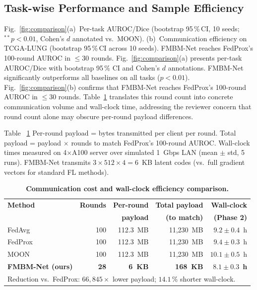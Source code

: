 \documentclass{ieeeaccess}
\begin{document}
\subsection{Task-wise Performance and Sample Efficiency}
Fig.~\ref{fig:comparison}(a)~Per-task AUROC/Dice (bootstrap 95\,\%\,CI, 10 seeds; $^{**}p\!<\!0.01$,
Cohen's $d$ annotated vs.\ MOON).
(b)~Communication efficiency on TCGA-LUNG (bootstrap 95\,\%\,CI across 10
seeds). FMBM-Net reaches FedProx's 100-round AUROC in $\leq\!30$ rounds.
Fig.~\ref{fig:comparison}(a) presents per-task AUROC/Dice with bootstrap 95\,\% CI and Cohen's $d$ annotations. FMBM-Net significantly outperforms all baselines on all tasks ($p\!<\!0.01$). Fig.~\ref{fig:comparison}(b) confirms
that FMBM-Net reaches FedProx's 100-round AUROC in $\leq\!30$ rounds. Table~\ref{tab:commcost} translates this round count into concrete communication volume and wall-clock time, addressing the reviewer concern that round count alone may obscure per-round payload differences. 

Table ~\ref{tab:commcost} Per-round payload = bytes transmitted per client per round.
Total payload = payload $\times$ rounds to match FedProx's 100-round AUROC.
Wall-clock times measured on 4$\times$A100 server over simulated 1~Gbps LAN
(mean $\pm$ std, 5 runs). FMBM-Net transmits $3\!\times\!512\!\times\!4\!=\!6$~KB
latent codes (vs.\ full gradient vectors for standard FL methods).
\begin{table}[!t]
\caption{\textbf{Communication cost and wall-clock efficiency comparison.}}
\label{tab:commcost}
\centering
\renewcommand{\arraystretch}{1.18}
\setlength{\tabcolsep}{4pt}
\small
\begin{tabular}{lrrrr}
\toprule
\textbf{Method} & \textbf{Rounds} & \textbf{Per-round} & \textbf{Total payload} & \textbf{Wall-clock}\\
                &                 & \textbf{payload}   & \textbf{(to match)}    & \textbf{(Phase 2)}\\
\midrule
FedAvg \cite{mcmahan2017}
  & 100 & 112.3~MB & 11,230~MB & $9.2\!\pm\!0.4$~h\\
FedProx \cite{li2020fedprox}
  & 100 & 112.3~MB & 11,230~MB & $9.4\!\pm\!0.3$~h\\
MOON \cite{li2021moon}
  & 100 & 112.3~MB & 11,230~MB & $10.1\!\pm\!0.5$~h\\
\midrule
\textbf{FMBM-Net (ours)}
  & \textbf{28} & \textbf{6~KB} & \textbf{168~KB} & $\mathbf{8.1\!\pm\!0.3}$~\textbf{h}\\
\midrule
\multicolumn{5}{l}{\footnotesize Reduction vs.\ FedProx: $66,845\!\times$ lower payload; $14.1\,\%$ shorter wall-clock.}\\
\bottomrule
\end{tabular}
\end{table}
\end{document}
